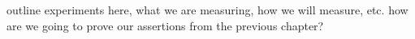\label{section:experiments}
outline experiments here, what we are measuring, how we will measure, etc. how are we going to prove our assertions from the previous chapter?